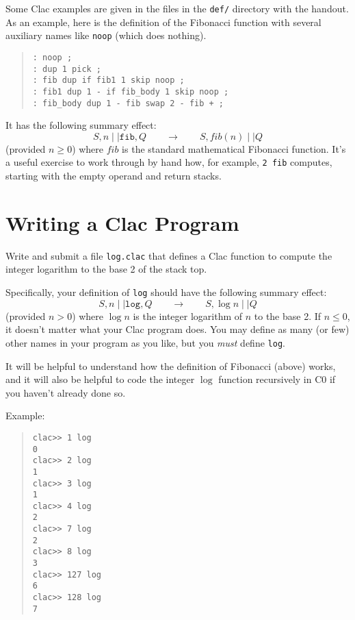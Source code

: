 \documentclass[12pt]{exam}
\begin{document}
Some Clac examples are given in the files in the \lstinline'def/'
directory with the handout.  As an example, here is the definition of
the Fibonacci function with several auxiliary names like
\lstinline'noop' (which does nothing).
\begin{quote}
\begin{lstlisting}[language={[clac]C}]
: noop ;
: dup 1 pick ;
: fib dup if fib1 1 skip noop ;
: fib1 dup 1 - if fib_body 1 skip noop ;
: fib_body dup 1 - fib swap 2 - fib + ;
\end{lstlisting}
\end{quote}
It has the following summary effect:
$$
 S, n \mid\mid \texttt{fib}, Q \qquad\longrightarrow\qquad S, \mathit{fib}(n) \mid\mid Q
$$
(provided $n \geq 0$) where $\mathit{fib}$ is the standard
mathematical Fibonacci function.  It's a useful exercise to work
through by hand how, for example, \lstinline'2 fib' computes, starting
with the empty operand and return stacks.


\section{Writing a Clac Program}

\vspace{-\bigskipamount}
\begin{task}[3]
  Write and submit a file \lstinline'log.clac' that defines a Clac function
  to compute the integer logarithm to the base 2 of the stack top.
\end{task}

Specifically, your definition of \lstinline'log' should have the
following summary effect:
$$
 S, n \mid\mid \texttt{log}, Q \qquad\longrightarrow\qquad S, \log n \mid\mid Q
$$
(provided $n > 0$) where $\log n$ is the integer logarithm of $n$ to
the base 2.  If $n \leq 0$, it doesn't matter what your Clac program
does. You may define as many (or few) other names in your program as
you like, but you \emph{must} define \lstinline'log'.

It will be helpful to understand how the definition of Fibonacci
(above) works, and it will also be helpful to code the integer $\log$
function recursively in C0 if you haven't already done so.

Example:
\begin{quote}
\begin{lstlisting}[language={[clac]C}]
clac>> 1 log
0
clac>> 2 log
1
clac>> 3 log
1
clac>> 4 log
2
clac>> 7 log
2
clac>> 8 log
3
clac>> 127 log
6
clac>> 128 log
7
\end{lstlisting}
\end{quote}
\end{document}
